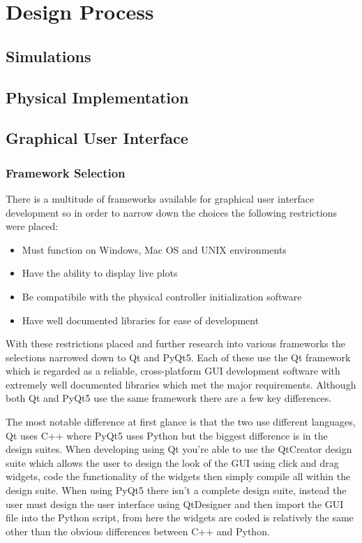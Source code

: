 
\section{Design Process}

\subsection{Simulations}

\subsection{Physical Implementation}



\subsection{Graphical User Interface}
\subsubsection{Framework Selection}

There is a multitude of frameworks available for graphical user interface development so in order to narrow down the choices the following restrictions were placed: 
\begin{itemize}
	\item Must function on Windows, Mac OS and UNIX environments
	\item Have the ability to display live plots
	\item Be compatibile with the physical controller initialization software
	\item Have well documented libraries for ease of development 
\end{itemize}
With these restrictions placed and further research into various frameworks the selections narrowed down to Qt and PyQt5. Each of these use the Qt framework which is regarded as a reliable, cross-platform GUI development software with extremely well documented libraries which met the major requirements. Although both Qt and PyQt5 use the same framework there are a few key differences. 

The most notable difference at first glance is that the two use different languages, Qt uses C++ where PyQt5 uses Python but the biggest difference is in the design suites. When developing using Qt you're able to use the QtCreator design suite which allows the user to design the look of the GUI using click and drag widgets, code the functionality of the widgets then simply compile all within the design suite. When using PyQt5 there isn't a complete design suite, instead the user must design the user interface using QtDesigner and then import the GUI file into the Python script, from here the widgets are coded is relatively the same other than the obvious differences between C++ and Python. 




